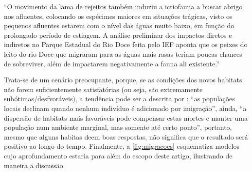 \documentclass[
article,			%
11pt,				%
oneside,			%
a4paper,			%
english,			%
brazil,				%
sumario=tradicional
]{abntex2}
\begin{document}
	\begin{citacao}
		``O
		movimento da lama de rejeitos também induziu a ictiofauna a buscar abrigo nos afluentes, colocando
		os espécimes maiores em situações trágicas, visto os pequenos afluentes estarem com o nível das águas
		muito baixo, em função do prolongado período de estiagem. A análise preliminar dos impactos
		diretos e indiretos no Parque Estadual do Rio Doce feita pelo IEF aponta que os peixes do leito do rio
		Doce que migraram para as águas mais rasas teriam poucas chances de sobreviver, além de impactarem
		negativamente a fauna ali existente.''
	\end{citacao}
	
	Trata-se de um cenário preocupante, porque, se as condições dos novos habitats não forem suficientemente satisfatórias (ou seja, são extremamente subótimas/desfvoráveis), a tendência pode ser a descrita por : ``as populações locais declinam quando nenhum indivíduo é adicionado por imigração'', ainda, ``a dispersão de habitats mais favoráveis pode compensar estas mortes e manter uma população num ambiente marginal, mas somente até certo ponto'', portanto, mesmo que alguns habitas deem boas respostas, não significa que o resultado será positivo ao longo do tempo. Finalmente, a \autoref{fig:migracoes} esquematiza modelos cujo aprofundamento estaria para além do escopo deste artigo, ilustrando de maneira a discussão.	
	
	
%	
%	
	\postextual
	
	
	
	\renewcommand{\glossaryname}{Glossário}
	\renewcommand*{\glsseeformat}[3][\seename]{\textit{#1}
		\glsseelist{#2}}
	
\end{document}
